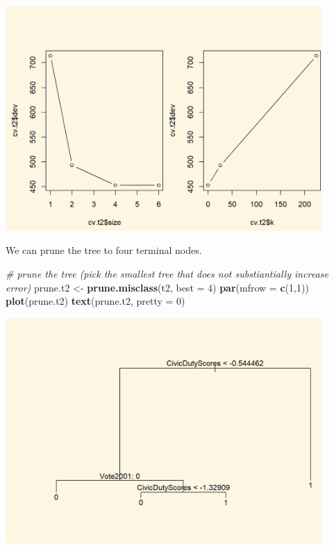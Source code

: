 \documentclass[]{article}
\newenvironment{Shaded}{\begin{snugshade}}{\end{snugshade}}
\newcommand{\CommentTok}[1]{\textcolor[rgb]{0.56,0.35,0.01}{\textit{#1}}}
\newcommand{\DataTypeTok}[1]{\textcolor[rgb]{0.13,0.29,0.53}{#1}}
\newcommand{\DecValTok}[1]{\textcolor[rgb]{0.00,0.00,0.81}{#1}}
\newcommand{\KeywordTok}[1]{\textcolor[rgb]{0.13,0.29,0.53}{\textbf{#1}}}
\newcommand{\NormalTok}[1]{#1}
\newcommand{\StringTok}[1]{\textcolor[rgb]{0.31,0.60,0.02}{#1}}
\begin{document}
\includegraphics[width=0.9\textwidth,height=\textheight]{./img/unnamed-chunk-142-1.png}

We can prune the tree to four terminal nodes.

\begin{Shaded}
\begin{Highlighting}[]
\CommentTok{# prune the tree (pick the smallest tree that does not substiantially increase error)}
\NormalTok{prune.t2 <-}\StringTok{ }\KeywordTok{prune.misclass}\NormalTok{(t2, }\DataTypeTok{best =} \DecValTok{4}\NormalTok{)}
\KeywordTok{par}\NormalTok{(}\DataTypeTok{mfrow =} \KeywordTok{c}\NormalTok{(}\DecValTok{1}\NormalTok{,}\DecValTok{1}\NormalTok{))}
\KeywordTok{plot}\NormalTok{(prune.t2)}
\KeywordTok{text}\NormalTok{(prune.t2, }\DataTypeTok{pretty =} \DecValTok{0}\NormalTok{)}
\end{Highlighting}
\end{Shaded}

\includegraphics[width=0.9\textwidth,height=\textheight]{./img/unnamed-chunk-143-1.png}
\end{document}
